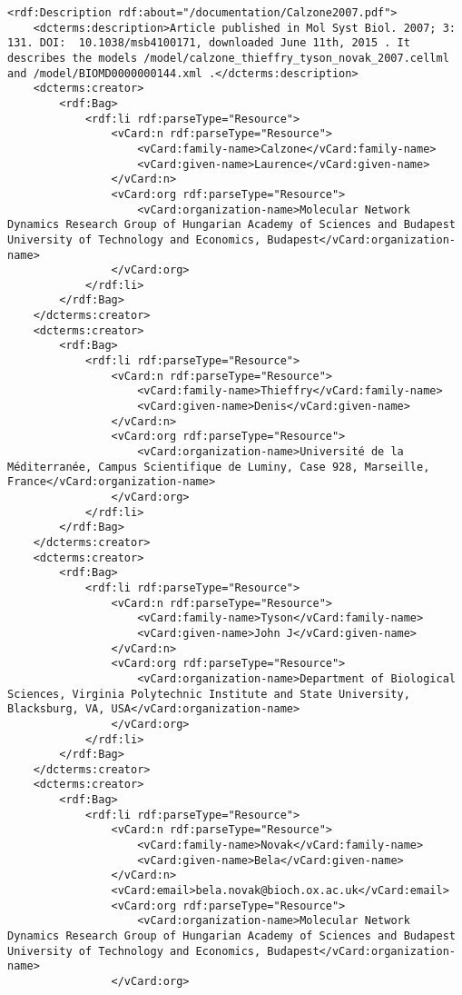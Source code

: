 \begin{mdframed}[style=mddefault,frametitle={Meta Data of the Publication \texttt{Calzone2007.pdf}}]
\begin{verbatim}
<rdf:Description rdf:about="/documentation/Calzone2007.pdf">
	<dcterms:description>Article published in Mol Syst Biol. 2007; 3: 131. DOI:  10.1038/msb4100171, downloaded June 11th, 2015 . It describes the models /model/calzone_thieffry_tyson_novak_2007.cellml and /model/BIOMD0000000144.xml .</dcterms:description>
	<dcterms:creator>
		<rdf:Bag>
			<rdf:li rdf:parseType="Resource">
				<vCard:n rdf:parseType="Resource">
					<vCard:family-name>Calzone</vCard:family-name>
					<vCard:given-name>Laurence</vCard:given-name>
				</vCard:n>
				<vCard:org rdf:parseType="Resource">
					<vCard:organization-name>Molecular Network Dynamics Research Group of Hungarian Academy of Sciences and Budapest University of Technology and Economics, Budapest</vCard:organization-name>
				</vCard:org>
			</rdf:li>
		</rdf:Bag>
	</dcterms:creator>
	<dcterms:creator>
		<rdf:Bag>
			<rdf:li rdf:parseType="Resource">
				<vCard:n rdf:parseType="Resource">
					<vCard:family-name>Thieffry</vCard:family-name>
					<vCard:given-name>Denis</vCard:given-name>
				</vCard:n>
				<vCard:org rdf:parseType="Resource">
					<vCard:organization-name>Université de la Méditerranée, Campus Scientifique de Luminy, Case 928, Marseille, France</vCard:organization-name>
				</vCard:org>
			</rdf:li>
		</rdf:Bag>
	</dcterms:creator>
	<dcterms:creator>
		<rdf:Bag>
			<rdf:li rdf:parseType="Resource">
				<vCard:n rdf:parseType="Resource">
					<vCard:family-name>Tyson</vCard:family-name>
					<vCard:given-name>John J</vCard:given-name>
				</vCard:n>
				<vCard:org rdf:parseType="Resource">
					<vCard:organization-name>Department of Biological Sciences, Virginia Polytechnic Institute and State University, Blacksburg, VA, USA</vCard:organization-name>
				</vCard:org>
			</rdf:li>
		</rdf:Bag>
	</dcterms:creator>
	<dcterms:creator>
		<rdf:Bag>
			<rdf:li rdf:parseType="Resource">
				<vCard:n rdf:parseType="Resource">
					<vCard:family-name>Novak</vCard:family-name>
					<vCard:given-name>Bela</vCard:given-name>
				</vCard:n>
				<vCard:email>bela.novak@bioch.ox.ac.uk</vCard:email>
				<vCard:org rdf:parseType="Resource">
					<vCard:organization-name>Molecular Network Dynamics Research Group of Hungarian Academy of Sciences and Budapest University of Technology and Economics, Budapest</vCard:organization-name>
				</vCard:org>

\end{verbatim}
\end{mdframed}
